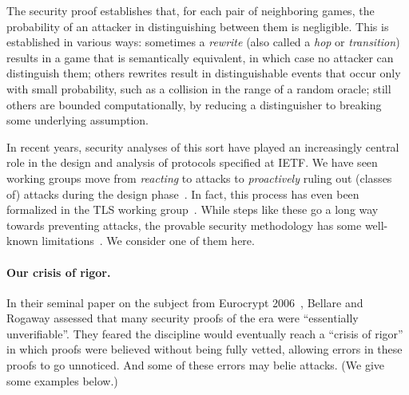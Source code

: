 \documentclass{article}
\begin{document}
The security proof establishes that, for each pair of neighboring games, the
probability of an attacker in distinguishing between them is negligible.
%
This is established in various ways:
%
sometimes a \emph{rewrite} (also called a \emph{hop} or \emph{transition})
results in a game that is semantically equivalent, in which case no attacker
can distinguish them;
%
others rewrites result in distinguishable events that occur only with small
probability, such as a collision in the range of a random oracle;
%
still others are bounded computationally, by reducing a distinguisher to
breaking some underlying assumption.

In recent years, security analyses of this sort have played an increasingly
central role in the design and analysis of protocols specified at IETF. We have
seen working groups move from \emph{reacting} to attacks to \emph{proactively}
ruling out (classes of) attacks during the design phase~\cite{KT16}.
%
In fact, this process has even been formalized in the TLS working
group~\cite{tls13-formal-analysis-triage-panel}.
%
While steps like these go a long way towards preventing attacks, the provable
security methodology has some well-known limitations~\cite{Ber19}.
%
We consider one of them here.

\paragraph{Our crisis of rigor.}
%
In their seminal paper on the subject from Eurocrypt 2006~\cite{BR06}, Bellare
and Rogaway assessed that many security proofs of the era were ``essentially
unverifiable''. They feared the discipline would eventually reach a ``crisis of
rigor'' in which proofs were believed without being fully vetted, allowing
errors in these proofs to go unnoticed. And some of these errors may belie
attacks. (We give some examples below.)
%
\end{document}
